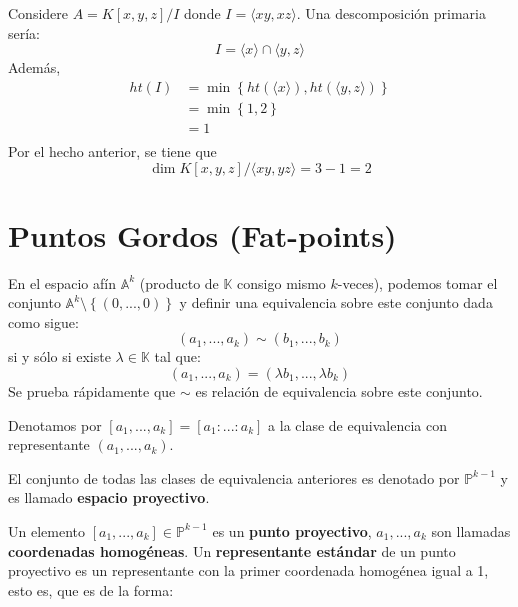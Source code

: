 \documentclass[12pt]{report}
\newcounter{it}
\theoremstyle{largebreak}
\begin{document}
    \begin{exa}
        Considere $A=K[x,y,z]/I$ donde $I=\langle xy,xz\rangle$. Una descomposición primaria sería:
        \begin{equation*}
            I=\langle x\rangle\cap\langle y,z\rangle
        \end{equation*}
        Además,
        \begin{equation*}
            \begin{split}
                ht(I)&=\min\left\{ht(\langle x\rangle),ht(\langle y,z\rangle)\right\}\\
                &=\min\left\{1,2 \right\}\\
                &=1\\
            \end{split}
        \end{equation*}
        Por el hecho anterior, se tiene que
        \begin{equation*}
            \dim K[x,y,z]/\langle xy,yz\rangle=3-1=2
        \end{equation*}
    \end{exa}

    \section{Puntos Gordos (Fat-points)}

    En el espacio afín $\mathbb{A}^k$ (producto de $\mathbb{K}$ consigo mismo $k$-veces), podemos tomar el conjunto $\mathbb{A}^k\setminus\left\{(0,...,0) \right\}$ y definir una equivalencia sobre este conjunto dada como sigue:
    \begin{equation*}
        (a_1,...,a_k)\sim(b_1,...,b_k)
    \end{equation*}
    si y sólo si existe $\lambda\in\mathbb{K}$ tal que:
    \begin{equation*}
        (a_1,...,a_k)=(\lambda b_1,...,\lambda b_k)
    \end{equation*}
    Se prueba rápidamente que $\sim$ es relación de equivalencia sobre este conjunto.
    
    Denotamos por $[a_1,...,a_k]=[a_1:...:a_k]$ a la clase de equivalencia con representante $(a_1,...,a_k)$.

    \begin{mydef}
        El conjunto de todas las clases de equivalencia anteriores es denotado por $\mathbb{P}^{ k-1}$ y es llamado \textbf{espacio proyectivo}.

        Un elemento $[a_1,...,a_k]\in\mathbb{P}^{ k-1}$ es un \textbf{punto proyectivo}, $a_1,...,a_k$ son llamadas \textbf{coordenadas homogéneas}. Un \textbf{representante estándar} de un punto proyectivo es un representante con la primer coordenada homogénea igual a 1, esto es, que es de la forma:
        \begin{equation*}
            [0,...,0,1,a_i,...,a_k]
        \end{equation*}
    \end{mydef}
\end{document}
